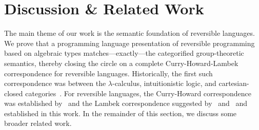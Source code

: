 \section{Discussion \& Related Work}
\label{sec:discussion}


The main theme of our work is the semantic foundation of reversible languages. We prove that a programming language
presentation of reversible programming based on algebraic types matches---exactly---the categorified group-theoretic
semantics, thereby closing the circle on a complete Curry-Howard-Lambek correspondence for reversible languages.
Historically, the first such correspondence was between the $\lambda$-calculus, intuitionistic logic, and
cartesian-closed categories~\cite{curryCurryEssaysCombinatory1980}. For reversible languages, the Curry-Howard
correspondence was established by~\citet{sparksSuperstructuralReversibleLogic2014} and the Lambek correspondence
suggested by~\citet{caretteComputingSemiringsWeak2016} and~\citet{threemodels} and established in this work. In the
remainder of this section, we discuss some broader related work.


